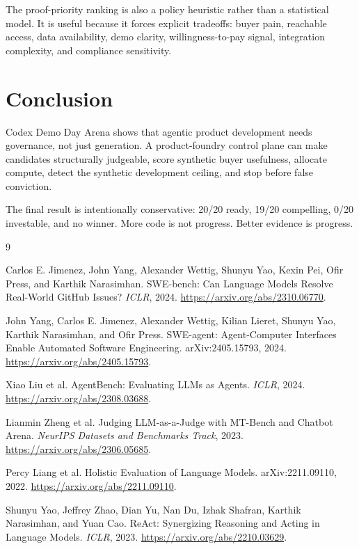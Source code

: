 \documentclass[11pt]{article}
\newcommand{\repo}{Codex Demo Day Arena}
\begin{document}
The proof-priority ranking is also a policy heuristic rather than a statistical model. It is useful because it forces explicit tradeoffs: buyer pain, reachable access, data availability, demo clarity, willingness-to-pay signal, integration complexity, and compliance sensitivity.

\section{Conclusion}

\repo{} shows that agentic product development needs governance, not just generation. A product-foundry control plane can make candidates structurally judgeable, score synthetic buyer usefulness, allocate compute, detect the synthetic development ceiling, and stop before false conviction.

The final result is intentionally conservative: 20/20 ready, 19/20 compelling, 0/20 investable, and no winner. More code is not progress. Better evidence is progress.

\begin{thebibliography}{9}

Carlos E. Jimenez, John Yang, Alexander Wettig, Shunyu Yao, Kexin Pei, Ofir Press, and Karthik Narasimhan.
\newblock SWE-bench: Can Language Models Resolve Real-World GitHub Issues?
\newblock \emph{ICLR}, 2024. \url{https://arxiv.org/abs/2310.06770}.

John Yang, Carlos E. Jimenez, Alexander Wettig, Kilian Lieret, Shunyu Yao, Karthik Narasimhan, and Ofir Press.
\newblock SWE-agent: Agent-Computer Interfaces Enable Automated Software Engineering.
\newblock arXiv:2405.15793, 2024. \url{https://arxiv.org/abs/2405.15793}.

Xiao Liu et al.
\newblock AgentBench: Evaluating LLMs as Agents.
\newblock \emph{ICLR}, 2024. \url{https://arxiv.org/abs/2308.03688}.

Lianmin Zheng et al.
\newblock Judging LLM-as-a-Judge with MT-Bench and Chatbot Arena.
\newblock \emph{NeurIPS Datasets and Benchmarks Track}, 2023. \url{https://arxiv.org/abs/2306.05685}.

Percy Liang et al.
\newblock Holistic Evaluation of Language Models.
\newblock arXiv:2211.09110, 2022. \url{https://arxiv.org/abs/2211.09110}.

Shunyu Yao, Jeffrey Zhao, Dian Yu, Nan Du, Izhak Shafran, Karthik Narasimhan, and Yuan Cao.
\newblock ReAct: Synergizing Reasoning and Acting in Language Models.
\newblock \emph{ICLR}, 2023. \url{https://arxiv.org/abs/2210.03629}.

\end{thebibliography}
\end{document}
